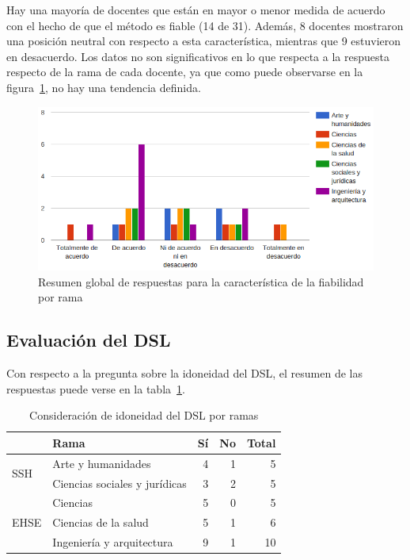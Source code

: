 Hay una mayoría de docentes que están en mayor o menor medida de acuerdo con el hecho de que el método es fiable (14 de 31). Además, 8 docentes mostraron una posición neutral con respecto a esta característica, mientras que 9 estuvieron en desacuerdo. Los datos no son significativos en lo que respecta a la respuesta respecto de la rama de cada docente, ya que como puede observarse en la figura~\ref{fig:evalmetodo:dba:fiabilidad:rama}, no hay una tendencia definida.

\begin{figure}[h]
  \begin{center}
    \includegraphics[scale=0.45]{C_DBA_fiabilidad_rama.png}
  \end{center}
  \caption{Resumen global de respuestas para la característica de la fiabilidad por rama}
  \label{fig:evalmetodo:dba:fiabilidad:rama}
\end{figure}


\subsection{Evaluación del DSL}

Con respecto a la pregunta sobre la idoneidad del DSL, el resumen de las respuestas puede verse en la tabla~\ref{tab:evalmetodo:encuesta:DSL:rama}.

\begin{table}[H]
  \begin{center}
  \begin{tabular}{| l | l | r | r | r |}
    \hline
    & Rama & Sí & No & Total \\
    \hline
    \hline
    \multirow{2}{2.5cm}{SSH} & Arte y humanidades & 4 & 1 & 5  \\
    \cline{2-5}
    & Ciencias sociales y jurídicas & 3 & 2 & 5  \\
    \hline
    \multirow{3}{2.5cm}{EHSE} & Ciencias & 5 & 0 & 5  \\
    \cline{2-5}
    & Ciencias de la salud & 5 & 1 & 6  \\
    \cline{2-5}
    & Ingeniería y arquitectura & 9 & 1 & 10 \\
    \hline
  \end{tabular}
\end{center}
\caption{Consideración de idoneidad del DSL por ramas}
\label{tab:evalmetodo:encuesta:DSL:rama}
\end{table}

